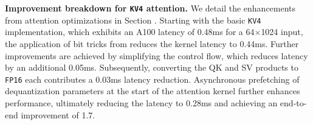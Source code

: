 \textbf{Improvement breakdown for \texttt{KV4} attention.} We detail the enhancements from attention optimizations in Section . Starting with the basic \texttt{KV4} implementation, which exhibits an A100 latency of 0.48ms for a 64$\times$1024 input, the application of bit tricks from \cite{kim2022says} reduces the kernel latency to 0.44ms. Further improvements are achieved by simplifying the control flow, which reduces latency by an additional 0.05ms. Subsequently, converting the QK and SV products to \texttt{FP16} each contributes a 0.03ms latency reduction. Asynchronous prefetching of dequantization parameters at the start of the attention kernel further enhances performance, ultimately reducing the latency to 0.28ms and achieving an end-to-end improvement of 1.7\x.
